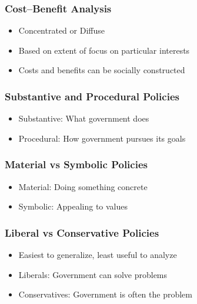 \documentclass{beamer}
\begin{document}
\begin{frame}
\frametitle{Cost--Benefit Analysis}
\begin{itemize}
    \item Concentrated or Diffuse
    \item Based on extent of focus on particular interests
    \item Costs and benefits can be socially constructed
\end{itemize}
\end{frame}

\begin{frame}
\frametitle{Substantive and Procedural Policies}
\begin{itemize}
    \item Substantive: What government does
    \item Procedural: How government pursues its goals
\end{itemize}
\end{frame}

\begin{frame}
\frametitle{Material vs Symbolic Policies}
\begin{itemize}
    \item Material: Doing something concrete
    \item Symbolic: Appealing to values
\end{itemize}
\end{frame}

\begin{frame}
\frametitle{Liberal vs Conservative Policies}
\begin{itemize}
    \item Easiest to generalize, least useful to analyze
    \item Liberals: Government can solve problems
    \item Conservatives: Government is often the problem
\end{itemize}
\end{frame}
\end{document}
